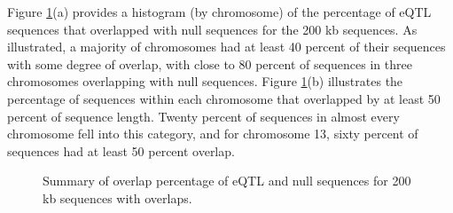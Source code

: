 \documentclass[12pt]{article}
\begin{document}
Figure \ref{fig: 100kbOverlaps}(a) provides a histogram (by chromosome) of the percentage of eQTL sequences that overlapped with null sequences for the 200 kb sequences. As illustrated, a majority of chromosomes had at least 40 percent of their sequences with some degree of overlap, with close to 80 percent of sequences in three chromosomes overlapping with null sequences. Figure \ref{fig: 100kbOverlaps}(b) illustrates the percentage of sequences within each chromosome that overlapped by at least 50 percent of sequence length. Twenty percent of sequences in almost every chromosome fell into this category, and for chromosome 13, sixty percent of sequences had at least 50 percent overlap.


\begin{figure}[!htbp]%
\centering
{}%
\qquad
{} 
\caption{Summary of overlap percentage of eQTL and null sequences for 200 kb sequences with overlaps.}
\label{fig: 100kbOverlaps} 
\end{figure}  
\end{document}
